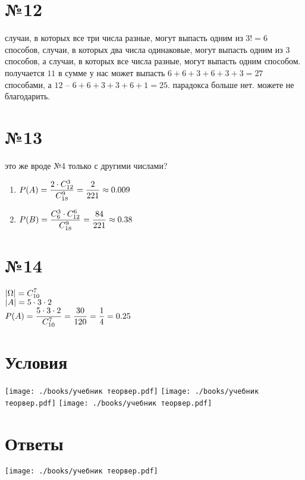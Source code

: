 \documentclass{article}
\newcommand{\hr}{\par\vspace{.5\baselineskip}\noindent\hrulefill\par}
\begin{document}
  \section*{№12}
  случаи, в которых все три числа разные, могут выпасть одним из $3! = 6$ способов,
  случаи, в которых два числа одинаковые, могут выпасть одним из $3$ способов,
  а случаи, в которых все числа разные, могут выпасть одним способом.
  получается $11$ в сумме у нас может выпасть $6+6+3+6+3+3=27$ способами,
  а $12$ -- $6+6+3+3+6+1=25$.
  парадокса больше нет. можете не благодарить.

  \section*{№13}
  это же вроде №4 только с другими числами?
  \begin{enumerate}[label=\realasbuk*)]
    \item $\displaystyle P(A) = \frac{2 \cdot C^3_{12}}{C^9_{18}} = \frac{2}{221} \approx 0.009 $
    \item $\displaystyle P(B) = \frac{C^3_6 \cdot C^6_{12}}{C^9_{18}} = \frac{84}{221} \approx 0.38 $
  \end{enumerate}

  \section*{№14}
  $\displaystyle \left|\Omega\right| = C^7_{10}$ \\
  $\displaystyle \left|A\right| = 5 \cdot 3 \cdot 2$ \\
  $\displaystyle P(A) = \frac{5 \cdot 3 \cdot 2}{C^7_{10}} = \frac{30}{120} = \frac{1}{4} = 0.25$

  \hr
  \section*{Условия}
  \texttt{[image: ./books/учебник теорвер.pdf]} \hfill
  \texttt{[image: ./books/учебник теорвер.pdf]} \hfill
  \texttt{[image: ./books/учебник теорвер.pdf]} \hfill

  \section*{Ответы}
  \texttt{[image: ./books/учебник теорвер.pdf]}
\end{document}
